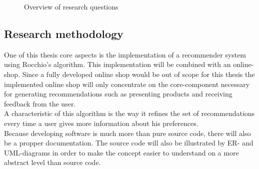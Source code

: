 \begin{figure}[h!]

    \caption{Overview of research questions}

\end{figure}





\subsection{Research methodology}
One of this thesis core aspects is the implementation of a recommender system using Rocchio's algorithm.
This implementation will be combined with an online-shop.
Since a fully developed online shop would be out of scope for this thesis the implemented online shop will only concentrate on the core-component necessary for generating recommendations such as presenting products and receiving feedback from the user.\\
A characteristic of this algorithm is the way it refines the set of recommendations every time a user gives more information about his preferences.\citep[p. 92]{lops:11}
\\
Because developing software is much more than pure source code, there will also be a propper documentation.
The source code will also be illustrated by ER- and UML-diagrams in order to make the concept easier to understand on a more abstract level than source code.

